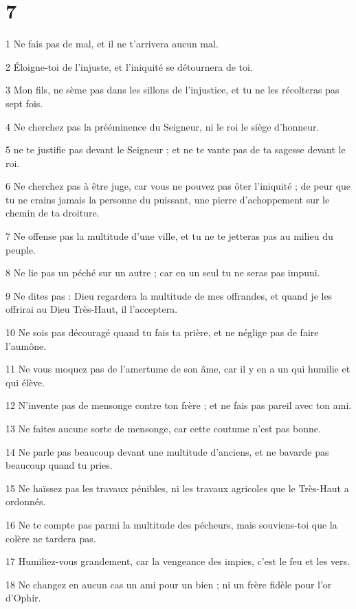 \chapter{7}

\par 1 Ne fais pas de mal, et il ne t'arrivera aucun mal.
\par 2 Éloigne-toi de l'injuste, et l'iniquité se détournera de toi.
\par 3 Mon fils, ne sème pas dans les sillons de l'injustice, et tu ne les récolteras pas sept fois.
\par 4 Ne cherchez pas la prééminence du Seigneur, ni le roi le siège d'honneur.
\par 5 ne te justifie pas devant le Seigneur ; et ne te vante pas de ta sagesse devant le roi.
\par 6 Ne cherchez pas à être juge, car vous ne pouvez pas ôter l'iniquité ; de peur que tu ne crains jamais la personne du puissant, une pierre d'achoppement sur le chemin de ta droiture.
\par 7 Ne offense pas la multitude d'une ville, et tu ne te jetteras pas au milieu du peuple.
\par 8 Ne lie pas un péché sur un autre ; car en un seul tu ne seras pas impuni.
\par 9 Ne dites pas : Dieu regardera la multitude de mes offrandes, et quand je les offrirai au Dieu Très-Haut, il l'acceptera.
\par 10 Ne sois pas découragé quand tu fais ta prière, et ne néglige pas de faire l'aumône.
\par 11 Ne vous moquez pas de l'amertume de son âme, car il y en a un qui humilie et qui élève.
\par 12 N'invente pas de mensonge contre ton frère ; et ne fais pas pareil avec ton ami.
\par 13 Ne faites aucune sorte de mensonge, car cette coutume n'est pas bonne.
\par 14 Ne parle pas beaucoup devant une multitude d'anciens, et ne bavarde pas beaucoup quand tu pries.
\par 15 Ne haïssez pas les travaux pénibles, ni les travaux agricoles que le Très-Haut a ordonnés.
\par 16 Ne te compte pas parmi la multitude des pécheurs, mais souviens-toi que la colère ne tardera pas.
\par 17 Humiliez-vous grandement, car la vengeance des impies, c'est le feu et les vers.
\par 18 Ne changez en aucun cas un ami pour un bien ; ni un frère fidèle pour l'or d'Ophir.
